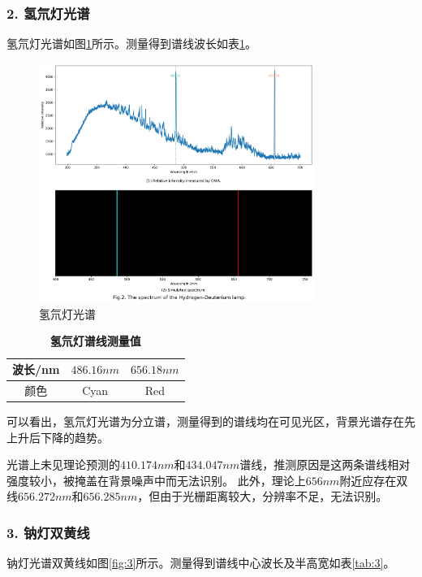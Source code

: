 \documentclass[12pt,a4paper,UTF8]{ctexart}
\begin{document}
\subsubsection*{2. 氢氘灯光谱}
氢氘灯光谱如图\ref{fig:2}所示。测量得到谱线波长如表\ref{tab:2}。

\begin{figure}[htbp]
	\centering
	\includegraphics[width=0.8\textwidth]{attachments//Fig.2.png}
	\caption{氢氘灯光谱}
	\label{fig:2}
\end{figure}

\begin{table}[htbp]
	\centering
	\begin{tabular}{ccc}
	\toprule
	波长/nm &$486.16nm$ &$656.18nm$ \\
	\midrule
	颜色 &Cyan &Red  \\
	\bottomrule
    \end{tabular}
    \caption{\textbf{氢氘灯谱线测量值}}
    \label{tab:2}
\end{table}

可以看出，氢氘灯光谱为分立谱，测量得到的谱线均在可见光区，背景光谱存在先上升后下降的趋势。

光谱上未见理论预测的$410.174nm$和$434.047nm$谱线，推测原因是这两条谱线相对强度较小，被掩盖在背景噪声中而无法识别。
此外，理论上$656nm$附近应存在双线$656.272nm$和$656.285nm$，但由于光栅距离较大，分辨率不足，无法识别。

\subsubsection*{3. 钠灯双黄线}
钠灯光谱双黄线如图\ref{fig:3}所示。测量得到谱线中心波长及半高宽如表\ref{tab:3}。
\end{document}
